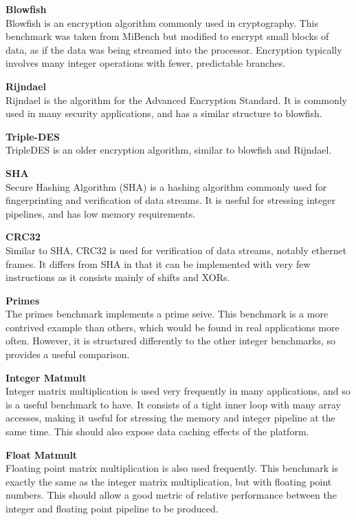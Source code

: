 \documentclass[twocolumn]{article}
\begin{document}
\vspace{3mm}
\textbf{Blowfish}\\
Blowfish is an encryption algorithm commonly used in cryptography. This benchmark was taken from MiBench but modified to encrypt small blocks of data, as if the data was being streamed into the processor. Encryption typically involves many integer operations with fewer, predictable branches.

\vspace{3mm}
\textbf{Rijndael}\\
Rijndael is the algorithm for the Advanced Encryption Standard. It is commonly used in many security applications, and has a similar structure to blowfish.

\vspace{3mm}
\textbf{Triple-DES}\\
TripleDES is an older encryption algorithm, similar to blowfish and Rijndael.

\vspace{3mm}
\textbf{SHA}\\
Secure Hashing Algorithm (SHA) is a hashing algorithm commonly used for fingerprinting and verification of data streams. It is useful for stressing integer pipelines, and has low memory requirements.

\vspace{3mm}
\textbf{CRC32}\\
Similar to SHA, CRC32 is used for verification of data streams, notably ethernet frames. It differs from SHA in that it can be implemented with very few instructions as it consists mainly of shifts and XORs.

\vspace{3mm}
\textbf{Primes}\\
The primes benchmark implements a prime seive. This benchmark is a more contrived example than others, which would be found in real applications more often. However, it is structured differently to the other integer benchmarks, so provides a useful comparison.

\vspace{3mm}
\textbf{Integer Matmult}\\
Integer matrix multiplication is used very frequently in many applications, and so is a useful benchmark to have. It consists of a tight inner loop with many array accesses, making it useful for stressing the memory and integer pipeline at the same time. This should also expose data caching effects of the platform.

\vspace{3mm}
\textbf{Float Matmult}\\
Floating point matrix multiplication is also used frequently. This benchmark is exactly the same as the integer matrix multiplication, but with floating point numbers. This should allow a good metric of relative performance between the integer and floating point pipeline to be produced.
\end{document}
